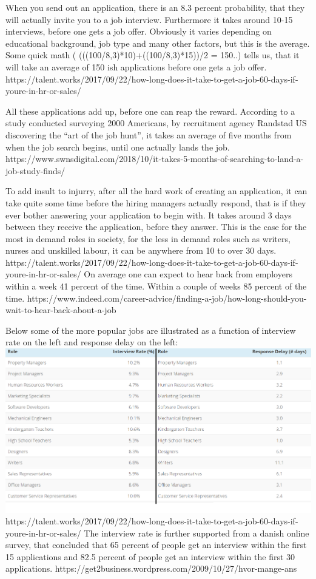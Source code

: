 When you send out an application, there is an 8.3 percent probability, that
they will actually invite you to a job interview. Furthermore it takes around
10-15 interviews, before one gets a job offer. Obviously it varies depending
on educational background, job type and many other factors, but this is the average.
Some quick math ( (((100/8,3)*10)+((100/8,3)*15))/2 = 150..) tells us, that it will
take an average of 150 ish applications before one gets a job offer.
https://talent.works/2017/09/22/how-long-does-it-take-to-get-a-job-60-days-if-youre-in-hr-or-sales/

All these applications add up, before one can reap the reward. According to a
study conducted surveying 2000 Americans, by recruitment agency Randstad US
discovering the “art of the job hunt”, it takes an average of five
months from when the job search begins, until one actually lands
the job.
https://www.swnsdigital.com/2018/10/it-takes-5-months-of-searching-to-land-a-job-study-finds/

To add insult to injurry, after all the hard work of creating an application, it can
take quite some time before the hiring managers actually respond, that is if they ever
bother answering your application to begin with.
It takes around 3 days between they receive the application, before they answer.
This is the case for the most in demand roles in society, for the less in demand roles
such as writers, nurses and unskilled labour, it can be anywhere from 10 to over 30 days.
https://talent.works/2017/09/22/how-long-does-it-take-to-get-a-job-60-days-if-youre-in-hr-or-sales/
On average one can expect to hear back from employers within a week 41 percent
of the time. Within a couple of weeks 85 percent of the time.
https://www.indeed.com/career-advice/finding-a-job/how-long-should-you-wait-to-hear-back-about-a-job

Below some of the more popular jobs are illustrated as a function of interview
rate on the left and response delay on the left:
\includegraphics{figures/interviewratexdelay.png}
https://talent.works/2017/09/22/how-long-does-it-take-to-get-a-job-60-days-if-youre-in-hr-or-sales/
The interview rate is further supported from a danish online survey, that concluded
that 65 percent of people get an interview within the first 15 applications and
 82.5 percent of people get an interview within the first 30 applications.
 https://get2business.wordpress.com/2009/10/27/hvor-mange-ans%

